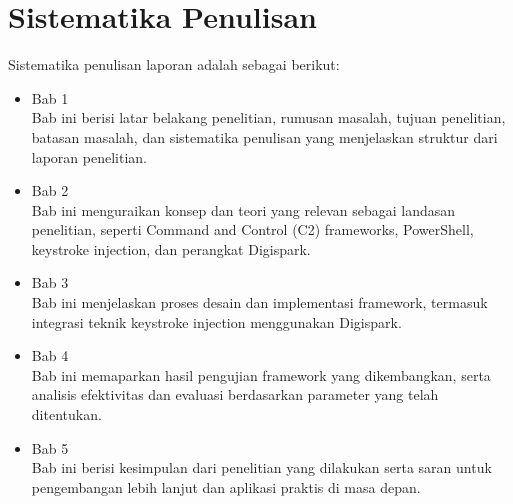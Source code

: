  
\section{Sistematika Penulisan}
Sistematika penulisan laporan adalah sebagai berikut:
\begin{itemize}
	\item Bab 1 \babSatu \\
    Bab ini berisi latar belakang penelitian, rumusan masalah, tujuan penelitian, batasan masalah, dan sistematika penulisan yang menjelaskan struktur dari laporan penelitian.
    
	\item Bab 2 \babDua \\
    Bab ini menguraikan konsep dan teori yang relevan sebagai landasan penelitian, seperti Command and Control (C2) frameworks, PowerShell, keystroke injection, dan perangkat Digispark.

	\item Bab 3 \babTiga \\
    Bab ini menjelaskan proses desain dan implementasi framework, termasuk integrasi teknik keystroke injection menggunakan Digispark.
    
	\item Bab 4 \babEmpat \\
    Bab ini memaparkan hasil pengujian framework yang dikembangkan, serta analisis efektivitas dan evaluasi berdasarkan parameter yang telah ditentukan.
    
	\item Bab 5 \babLima \\
    Bab ini berisi kesimpulan dari penelitian yang dilakukan serta saran untuk pengembangan lebih lanjut dan aplikasi praktis di masa depan.

\end{itemize}


